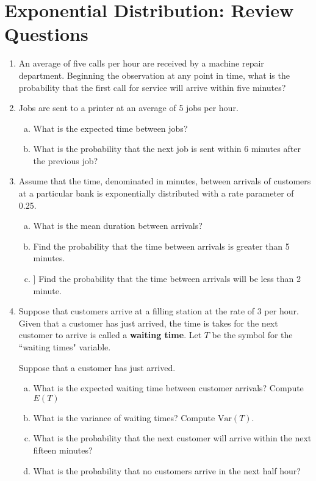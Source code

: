 \documentclass[a4paper,12pt]{article}
\begin{document}
\section*{Exponential Distribution: Review Questions}
\begin{enumerate}
\item
An average of five calls per hour are received by a machine repair department. 
Beginning the observation at any point in time, what is the probability that the first call for service will arrive within five minutes?

\item Jobs are sent to a printer at an average of 5 jobs per hour. 
\begin{enumerate}[(a)]
	\item What is the expected time between jobs? 
	\item What is the probability that the next job is sent within 6 minutes after the previous job?
\end{enumerate}

\item 
Assume that the time, denominated in minutes, between arrivals of customers at a particular bank is exponentially distributed with a rate parameter of 0.25. 

\begin{enumerate}[(a)]
    \item What is the mean duration between arrivals?
	\item
	Find the probability that the time between arrivals is greater than 5 minutes.
	\item]
	Find the probability that the time between arrivals will be less than 2 minute.
\end{enumerate}


\item Suppose that customers arrive at a filling station at the rate of 3 per hour. Given that a customer has just arrived, the time is takes for the next customer to arrive is called a \textbf{waiting time}. Let $T$ be the symbol for the ``waiting times" variable. 


Suppose that a customer has just arrived.
\begin{enumerate}[(a)] \item What is the expected waiting time between customer arrivals? 
\subitem Compute $E(T)$
\item What is the variance of waiting times? \subitem Compute $\mbox{Var}(T)$.
	\item What is the probability that the next customer will arrive within the next fifteen minutes?
	\item What is the probability that no customers arrive in the next half hour?
\end{enumerate}





\end{enumerate}
\end{document}
